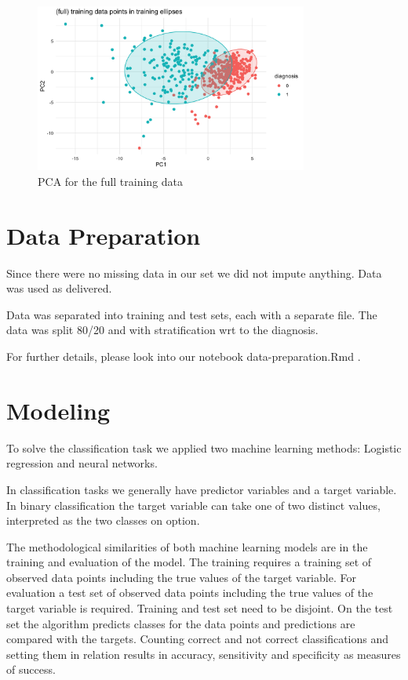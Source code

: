 \documentclass[]{article}
\begin{document}
\begin{figure}
    \centering
    \includegraphics[width=0.8\textwidth]{images/A-training-full-PCA.png}
    \caption{PCA for the full training data}
    \label{fig:A-training-full-PCA}
\end{figure}

\section{Data Preparation}\label{data-preparation}

Since there were no missing data in our set we did not impute anything.
Data was used as delivered.

Data was separated into training and test sets, each with a separate
file. The data was split 80/20 and with stratification wrt to the
diagnosis.

For further details, please look into our notebook data-preparation.Rmd
.

\section{Modeling}\label{modeling}

To solve the classification task we applied two machine learning
methods: Logistic regression and neural networks.

In classification tasks we generally have predictor variables and a
target variable. In binary classification the target variable can take
one of two distinct values, interpreted as the two classes on option.

The methodological similarities of both machine learning models are in
the training and evaluation of the model. The training requires a
training set of observed data points including the true values of the
target variable. For evaluation a test set of observed data points
including the true values of the target variable is required. Training
and test set need to be disjoint. On the test set the algorithm predicts
classes for the data points and predictions are compared with the
targets. Counting correct and not correct classifications and setting
them in relation results in accuracy, sensitivity and specificity as
measures of success.
\end{document}
